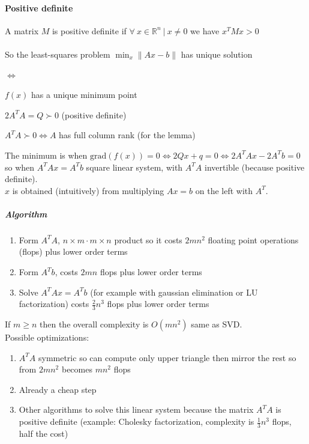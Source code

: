 \documentclass[10pt]{report}
\begin{document}
\paragraph{Positive definite} A matrix $M$ is positive definite if $\forall\:x\in\mathbb{R}^n\:|\:x\neq0$ we have $x^TMx>0$\\\\
So the least-squares problem $\min_x \|Ax-b\|$ has unique solution
\begin{list}{$\Leftrightarrow$}{}
	\item $f(x)$ has a unique minimum point
	\item $2A^TA = Q \succ 0$ (positive definite)
	\item $A^TA \succ 0 \Leftrightarrow A$ has full column rank (for the lemma)
\end{list}
The minimum is when $\text{grad}(f(x)) = 0 \Leftrightarrow 2Qx + q = 0 \Leftrightarrow 2A^TAx - 2A^Tb = 0$ so when $A^TAx = A^Tb$ square linear system, with $A^TA$ invertible (because positive definite).\\
$x$ is obtained (intuitively) from multiplying $Ax=b$ on the left with $A^T$.
\subparagraph{Algorithm}
\begin{enumerate}
	\item Form $A^TA$, $n\times m\cdot m\times n$ product so it costs $2mn^2$ floating point operations (flops) plus lower order terms
	\item Form $A^Tb$, costs $2mn$ flops plus lower order terms
	\item Solve $A^TAx = A^Tb$ (for example with gaussian elimination or LU factorization) costs $\frac{2}{3}n^3$ flops plus lower order terms
\end{enumerate}
If $m \geq n$ then the overall complexity is $O(mn^2)$ same as SVD.\\
Possible optimizations:
\begin{enumerate}
	\item $A^TA$ symmetric so can compute only upper triangle then mirror the rest so from $2mn^2$ becomes $mn^2$ flops
	\item Already a cheap step
	\item Other algorithms to solve this linear system because the matrix $A^TA$ is positive definite (example: Cholesky factorization, complexity is $\frac{1}{3}n^3$ flops, half the cost)
\end{enumerate}
\end{document}
